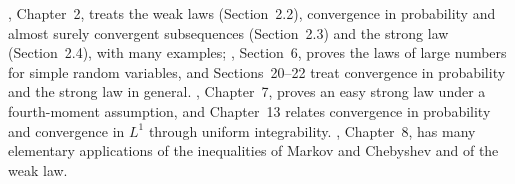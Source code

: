 
\furtherreading
\textcite{durrett}, Chapter~2, treats the weak laws (Section~2.2), convergence in probability
and almost surely convergent subsequences (Section~2.3) and the strong law (Section~2.4), with
many examples; \textcite{billingsley}, Section~6, proves the laws of large numbers for simple
random variables, and Sections~20--22 treat convergence in probability and the strong law in
general.
\textcite{williams}, Chapter~7, proves an easy strong law under a fourth-moment assumption, and
Chapter~13 relates convergence in probability and convergence in $L^1$ through uniform
integrability. \textcite{ross-5}, Chapter~8, has many elementary applications of the inequalities
of Markov and Chebyshev and of the weak law.
